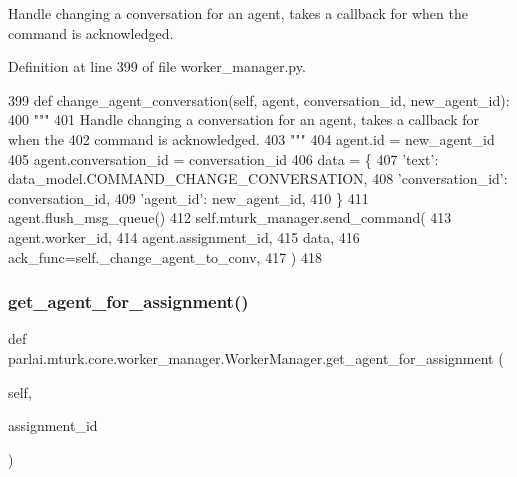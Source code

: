 \begin{DoxyVerb}Handle changing a conversation for an agent, takes a callback for when the
command is acknowledged.
\end{DoxyVerb}
 

Definition at line 399 of file worker\+\_\+manager.\+py.


\begin{DoxyCode}
399     \textcolor{keyword}{def }change\_agent\_conversation(self, agent, conversation\_id, new\_agent\_id):
400         \textcolor{stringliteral}{"""}
401 \textcolor{stringliteral}{        Handle changing a conversation for an agent, takes a callback for when the}
402 \textcolor{stringliteral}{        command is acknowledged.}
403 \textcolor{stringliteral}{        """}
404         agent.id = new\_agent\_id
405         agent.conversation\_id = conversation\_id
406         data = \{
407             \textcolor{stringliteral}{'text'}: data\_model.COMMAND\_CHANGE\_CONVERSATION,
408             \textcolor{stringliteral}{'conversation\_id'}: conversation\_id,
409             \textcolor{stringliteral}{'agent\_id'}: new\_agent\_id,
410         \}
411         agent.flush\_msg\_queue()
412         self.mturk\_manager.send\_command(
413             agent.worker\_id,
414             agent.assignment\_id,
415             data,
416             ack\_func=self.\_change\_agent\_to\_conv,
417         )
418 
\end{DoxyCode}
\mbox{\label{classparlai_1_1mturk_1_1core_1_1worker__manager_1_1WorkerManager_aa60e04ed5327e2b3dc9f886a17352e72}} 
\subsubsection{\texorpdfstring{get\+\_\+agent\+\_\+for\+\_\+assignment()}{get\_agent\_for\_assignment()}}
{\footnotesize\ttfamily def parlai.\+mturk.\+core.\+worker\+\_\+manager.\+Worker\+Manager.\+get\+\_\+agent\+\_\+for\+\_\+assignment (\begin{DoxyParamCaption}\item[{}]{self,  }\item[{}]{assignment\+\_\+id }\end{DoxyParamCaption})}

